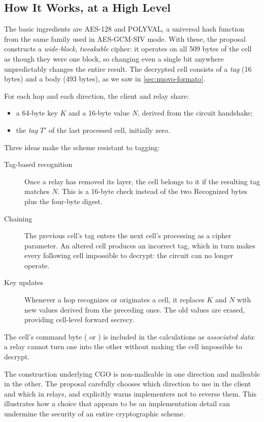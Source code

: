 \subsection{How It Works, at a High Level}

The basic ingredients are AES-128 and POLYVAL, a universal hash function from the same family used in AES-GCM-SIV mode. With these, the proposal constructs a \emph{wide-block}, \emph{tweakable} cipher: it operates on all 509 bytes of the cell as though they were one block, so changing even a single bit anywhere unpredictably changes the entire result. The decrypted cell consists of a \emph{tag} (16 bytes) and a body (493 bytes), as we saw in \cref{sec:nuovo-formato}.

For each hop and each direction, the client and relay share:
\begin{itemize}
  \item a 64-byte key $K$ and a 16-byte value $N$, derived from the circuit handshake;
  \item the \emph{tag} $T'$ of the last processed cell, initially zero.
\end{itemize}
Three ideas make the scheme resistant to tagging:
\begin{description}
  \item[Tag-based recognition] Once a relay has removed its layer, the cell belongs to it if the resulting tag matches $N$. This is a 16-byte check instead of the two Recognized bytes plus the four-byte digest.
  \item[Chaining] The previous cell's tag enters the next cell's processing as a cipher parameter. An altered cell produces an incorrect tag, which in turn makes every following cell impossible to decrypt: the circuit can no longer operate.
  \item[Key updates] Whenever a hop recognizes or originates a cell, it replaces $K$ and $N$ with new values derived from the preceding ones. The old values are erased, providing cell-level forward secrecy.
\end{description}
The cell's command byte ( or ) is included in the calculations as \emph{associated data}: a relay cannot turn one into the other without making the cell impossible to decrypt.

\begin{attenzione}
The construction underlying CGO is non-malleable in one direction and malleable in the other. The proposal carefully chooses which direction to use in the client and which in relays, and explicitly warns implementers not to reverse them. This illustrates how a choice that appears to be an implementation detail can undermine the security of an entire cryptographic scheme.
\end{attenzione}

